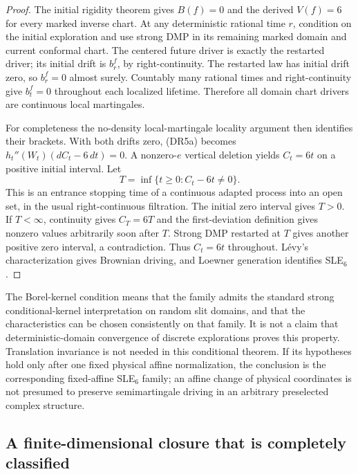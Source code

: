 \documentclass[11pt]{article}
\theoremstyle{definition}\newtheorem{definition}[theorem]{Definition}
\theoremstyle{remark}\newtheorem{remark}[theorem]{Remark}
\begin{document}
\begin{proof}
The initial rigidity theorem gives $B(f)=0$ and the derived $V(f)=6$ for
every marked inverse chart.  At any deterministic rational time $r$,
condition on the initial exploration and use strong DMP in its remaining
marked domain and current conformal chart.  The centered future driver is
exactly the restarted driver; its initial drift is $b^f_r$, by
right-continuity.  The restarted law has initial drift zero, so
$b^f_r=0$ almost surely.  Countably many rational times and right-continuity
give $b^f_t=0$ throughout each localized lifetime.  Therefore all domain
chart drivers are continuous local martingales.

For completeness the no-density local-martingale locality argument then
identifies their brackets.  With both drifts zero, (DR5a) becomes
$h_t''(W_t)(dC_t-6\,dt)=0$.  A nonzero-$e$ vertical deletion yields
$C_t=6t$ on a positive initial interval.  Let
\[
 T=\inf\{t\geq0:C_t-6t\ne0\}.
\]
This is an entrance stopping time of a continuous adapted process into an
open set, in the usual right-continuous filtration.  The initial zero
interval gives $T>0$.  If $T<\infty$, continuity gives $C_T=6T$ and the
first-deviation definition gives nonzero values arbitrarily soon after $T$.
Strong DMP restarted at $T$ gives another positive zero interval, a
contradiction.  Thus $C_t=6t$ throughout.  L\'evy's characterization gives
Brownian driving, and Loewner generation identifies SLE$_6$.
\end{proof}

The Borel-kernel condition means that the family admits the standard strong
conditional-kernel interpretation on random slit domains, and that the
characteristics can be chosen consistently on that family.  It is not a
claim that deterministic-domain convergence of discrete explorations proves
this property.  Translation invariance is not needed in this conditional
theorem.  If its hypotheses hold only after one fixed physical affine
normalization, the conclusion is the corresponding fixed-affine SLE$_6$
family; an affine change of physical coordinates is not presumed to preserve
semimartingale driving in an arbitrary preselected complex structure.

\subsection{A finite-dimensional closure that is completely classified}
\end{document}
